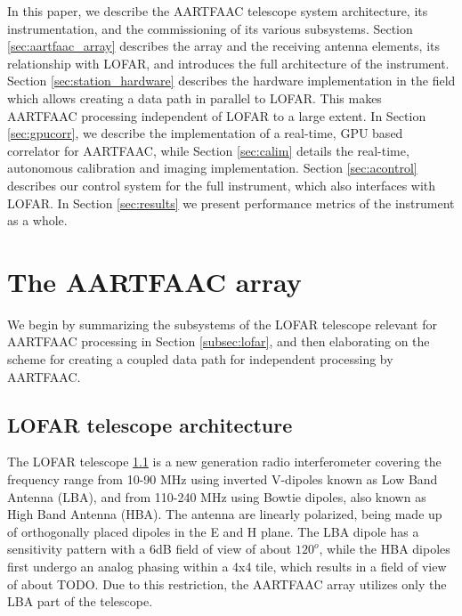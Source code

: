 \documentclass{aa}
\begin{document}
\begin{itemize}
In  this paper,  we describe  the  AARTFAAC telescope  system architecture,  its
instrumentation,  and  the commissioning  of  its  various subsystems.   Section
\ref{sec:aartfaac_array} describes the array and the receiving antenna elements,
its  relationship  with LOFAR,  and  introduces  the  full architecture  of  the
instrument.    Section   \ref{sec:station_hardware}   describes   the   hardware
implementation in  the field which  allows creating a  data path in  parallel to
LOFAR. This  makes AARTFAAC processing independent  of LOFAR to a  large extent.
In Section \ref{sec:gpucorr}, we describe the implementation of a real-time, GPU
based  correlator  for  AARTFAAC,  while  Section  \ref{sec:calim}  details  the
real-time,   autonomous  calibration   and   imaging  implementation.    Section
\ref{sec:acontrol} describes our  control system for the  full instrument, which
also interfaces with LOFAR.  In Section \ref{sec:results} we present performance
metrics of the instrument as a whole.
\end{itemize}

\section {\label{sec:aartfaac_array}The AARTFAAC array}
We  begin by  summarizing the  subsystems of  the LOFAR  telescope relevant  for
AARTFAAC processing in  Section \ref{subsec:lofar}, and then  elaborating on the
scheme for creating a coupled data path for independent processing by AARTFAAC.

\subsection {\label{subsec:lofar} LOFAR telescope architecture}
The LOFAR telescope \ref{} is a new generation radio interferometer covering the
frequency  range from  10-90  MHz using  inverted V-dipoles  known  as Low  Band
Antenna (LBA),  and from 110-240  MHz using Bowtie  dipoles, also known  as High
Band  Antenna (HBA).   The  antenna are  linearly polarized,  being  made up  of
orthogonally  placed  dipoles in  the  E  and H  plane.  The  LBA dipole  has  a
sensitivity pattern  with a 6dB  field of view of  about $120^o$, while  the HBA
dipoles first undergo  an analog phasing within  a 4x4 tile, which  results in a
field  of view  of  about TODO.  Due  to this  restriction,  the AARTFAAC  array
utilizes only the LBA part of the telescope.
\end{document}
